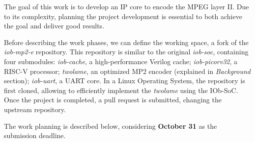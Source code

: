 
The goal of this work is to develop an IP core to encode the MPEG layer II. Due to its complexity, planning the project development is essential to both achieve the goal and deliver good results. 

Before describing the work phases, we can define the working space, a fork of the \textit{iob-mp2-e} repository. 
This repository is similar to the original \textit{iob-soc}, containing four submodules: \textit{iob-cache}, a high-performance Verilog cache; \textit{iob-picorv32}, a RISC-V processor; \textit{twolame}, an optimized MP2 encoder (explained in \textit{Background} section); \textit{iob-uart}, a UART core.
In a Linux Operating System, the repository is first cloned, allowing to efficiently implement the \textit{twolame} using the IOb-SoC. Once the project is completed, a pull request is submitted, changing the upstream repository.

The work planning is described below, considering \textbf{October 31} as the submission deadline.


